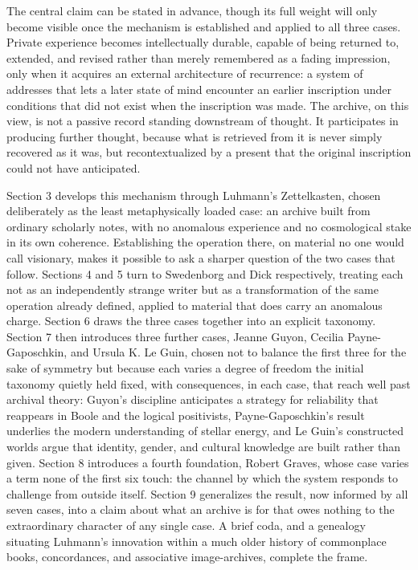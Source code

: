 \documentclass[11pt]{article}
\begin{document}
The central claim can be stated in advance, though its full weight will only become visible once the mechanism is established and applied to all three cases. Private experience becomes intellectually durable, capable of being returned to, extended, and revised rather than merely remembered as a fading impression, only when it acquires an external architecture of recurrence: a system of addresses that lets a later state of mind encounter an earlier inscription under conditions that did not exist when the inscription was made. The archive, on this view, is not a passive record standing downstream of thought. It participates in producing further thought, because what is retrieved from it is never simply recovered as it was, but recontextualized by a present that the original inscription could not have anticipated.

Section 3 develops this mechanism through Luhmann's Zettelkasten, chosen deliberately as the least metaphysically loaded case: an archive built from ordinary scholarly notes, with no anomalous experience and no cosmological stake in its own coherence. Establishing the operation there, on material no one would call visionary, makes it possible to ask a sharper question of the two cases that follow. Sections 4 and 5 turn to Swedenborg and Dick respectively, treating each not as an independently strange writer but as a transformation of the same operation already defined, applied to material that does carry an anomalous charge. Section 6 draws the three cases together into an explicit taxonomy. Section 7 then introduces three further cases, Jeanne Guyon, Cecilia Payne-Gaposchkin, and Ursula K. Le Guin, chosen not to balance the first three for the sake of symmetry but because each varies a degree of freedom the initial taxonomy quietly held fixed, with consequences, in each case, that reach well past archival theory: Guyon's discipline anticipates a strategy for reliability that reappears in Boole and the logical positivists, Payne-Gaposchkin's result underlies the modern understanding of stellar energy, and Le Guin's constructed worlds argue that identity, gender, and cultural knowledge are built rather than given. Section 8 introduces a fourth foundation, Robert Graves, whose case varies a term none of the first six touch: the channel by which the system responds to challenge from outside itself. Section 9 generalizes the result, now informed by all seven cases, into a claim about what an archive is for that owes nothing to the extraordinary character of any single case. A brief coda, and a genealogy situating Luhmann's innovation within a much older history of commonplace books, concordances, and associative image-archives, complete the frame.
\end{document}
